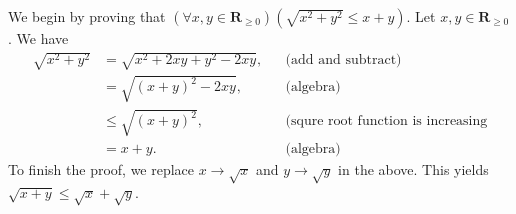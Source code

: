 \documentclass[12pt, fleqn]{exam}
\newcommand{\reals}{\mathbf{R}}
\begin{document}
\begin{questions}
\begin{solution} We begin by proving that $\left(\forall x,y \in \reals_{\geq 0}\right)(\sqrt{x^2 + y^2} \leq x + y) $.
Let $x,y \in \reals_{\geq 0}$. We have
\begin{align*}
\sqrt{x^2 + y^2} &= \sqrt{x^2 + 2 x y + y^2 - 2 x y}, &&\mbox{(add and subtract)} \\
                           &= \sqrt{(x + y)^2 - 2 x y}, &&\mbox{(algebra)} \\
                           &\leq \sqrt{(x + y)^2}, &&\mbox{(squre root function is increasing} \\
                           &= x + y.  &&\mbox{(algebra)} 
\end{align*}
To finish the proof, we replace $x \to \sqrt{x}$ and  $y \to \sqrt{y}$ in the above. This yields
$\sqrt{x+y} \leq \sqrt{x} + \sqrt{y}$.

\end{solution}
\end{questions}
\end{document}

